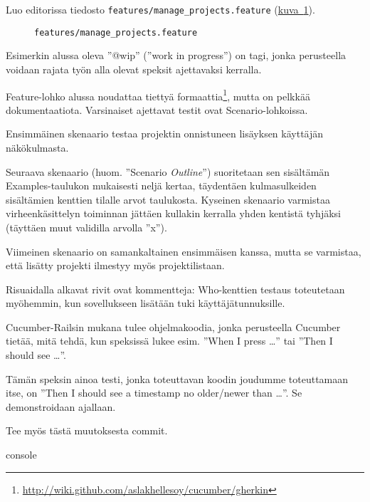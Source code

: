 \documentclass{article}
\newenvironment{myfigure}[1][tbp]{
  \begin{figure}[#1]
    \centering
    \begin{lrbox}{\myfigurebox}
      \begin{minipage}{\textwidth}
}{
      \end{minipage}
    \end{lrbox}
    \colorbox{blue!4}{\usebox{\myfigurebox}}
  \end{figure}
}
\newcommand{\myref}[2]{\hyperref[#2]{#1~\ref*{#2}}}
\newcommand{\pdfforeignlanguage}[2]{\texorpdfstring{\foreignlanguage{#1}{#2}}{#2}}
\newcommand{\eng}[1]{\pdfforeignlanguage{english}{#1}}
\begin{document}
Luo editorissa tiedosto \texttt{features/manage\_projects.feature}
(\myref{kuva}{fig:manage-projects-feature}).

\begin{myfigure}
\caption{\texttt{features/manage\_projects.feature}}
\label{fig:manage-projects-feature}

\end{myfigure}

Esimerkin alussa oleva ''@wip'' (''\eng{work in progress}'') on tagi, jonka
perusteella voidaan rajata työn alla olevat speksit ajettavaksi kerralla.

\eng{Feature}-lohko alussa noudattaa tiettyä
formaattia\footnote{\url{http://wiki.github.com/aslakhellesoy/cucumber/gherkin}},
mutta on pelkkää dokumentaatiota. Varsinaiset ajettavat testit ovat
\eng{Scenario}-lohkoissa.

Ensimmäinen skenaario testaa projektin onnistuneen lisäyksen käyttäjän
näkökulmasta.

Seuraava skenaario (huom. ''\eng{Scenario \emph{Outline}}'') suoritetaan sen
sisältämän \eng{Examples}-taulukon mukaisesti neljä kertaa, täydentäen
kulmasulkeiden sisältämien kenttien tilalle arvot taulukosta.  Kyseinen
skenaario varmistaa virheenkäsittelyn toiminnan jättäen kullakin kerralla yhden
kentistä tyhjäksi (täyttäen muut validilla arvolla ''x'').

Viimeinen skenaario on samankaltainen ensimmäisen kanssa, mutta se varmistaa,
että lisätty projekti ilmestyy myös projektilistaan.

Risuaidalla alkavat rivit ovat kommentteja: \eng{Who}-kenttien testaus
toteutetaan myöhemmin, kun sovellukseen lisätään tuki käyttäjätunnuksille.

Cucumber-Railsin mukana tulee ohjelmakoodia, jonka perusteella \eng{Cucumber}
tietää, mitä tehdä, kun speksissä lukee esim. ''\eng{When I press \dots''} tai
''\eng{Then I should see \dots}''.

Tämän speksin ainoa testi, jonka toteuttavan koodin joudumme toteuttamaan itse,
on ''\eng{Then I should see a timestamp no older/newer than \dots}''. Se
demonstroidaan ajallaan.

\begin{samepage}
Tee myös tästä muutoksesta commit.

\begin{pygmented}{console}
\end{pygmented}
\end{samepage}
\end{document}
